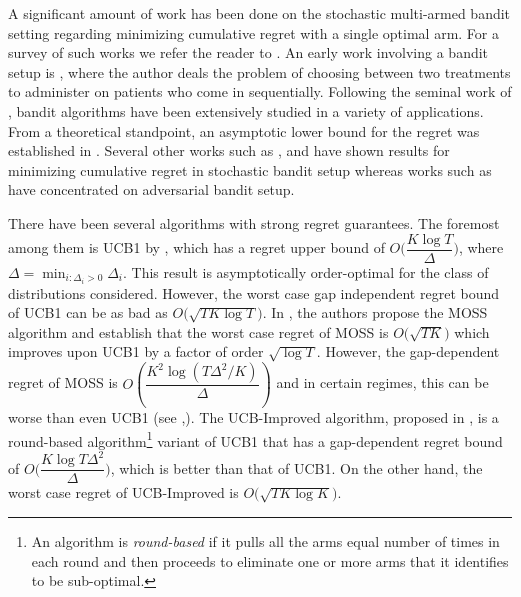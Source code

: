 	A significant amount of work has been done on the stochastic multi-armed bandit setting regarding minimizing cumulative regret with a single optimal arm. For a survey of such works we refer the reader to \cite{bubeck2012regret}. An early work involving a bandit setup is \cite{thompson1933likelihood}, where the author deals the problem of choosing between two treatments to administer on patients who come in sequentially. Following the seminal work of  \cite{robbins1952some}, bandit algorithms have been extensively studied in a variety of applications. From a theoretical standpoint, an asymptotic lower bound for the regret was established in \cite{lai1985asymptotically}. Several other works such as \cite{auer2002finite},  \cite{audibert2009minimax} and \cite{auer2010ucb} have shown results for minimizing cumulative regret in stochastic bandit setup whereas works such as \cite{auer2002nonstochastic} have concentrated on adversarial bandit setup.
	
	

	There have been several algorithms with strong regret guarantees. The foremost among them is UCB1 by  \cite{auer2002finite}, which has a regret upper bound of $O\bigg(\dfrac{K\log T}{\Delta}\bigg)$, where $\Delta = \min_{i:\Delta_i>0} \Delta_i$. This result is asymptotically order-optimal for the class of distributions considered. However, the worst case gap independent regret bound of UCB1  can be as bad as $O \bigg(\sqrt{TK\log T}\bigg)$.  In \cite{audibert2009minimax}, the authors propose the MOSS algorithm and establish that the worst case regret of MOSS is $O\bigg(\sqrt{TK}\bigg)$ which improves upon UCB1 by a factor of order $\sqrt{\log T}$. However, the gap-dependent regret of MOSS is  $O\left(\dfrac{K^{2}\log\left(T\Delta^{2}/K\right)}{\Delta}\right)$ and in certain regimes, this can be worse than even UCB1 (see \cite{audibert2009minimax},\cite{lattimore2015optimally}). The UCB-Improved algorithm, proposed in \cite{auer2010ucb}, is a round-based algorithm\footnote{An algorithm is \textit{round-based} if it pulls all the arms equal number of times in each round and then proceeds to eliminate one or more arms that it identifies to be sub-optimal.} variant of UCB1 that has a gap-dependent regret bound of $O\bigg(\dfrac{K\log T\Delta^{2}}{\Delta}\bigg)$, which is better than that of UCB1. On the other hand, the worst case regret of UCB-Improved is $O\bigg(\sqrt{TK\log K}\bigg)$. 

